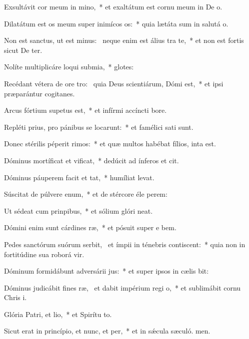 \item Exsultávit cor meum in mino,~* et exaltátum est cornu meum in De o.
\item Dilatátum est os meum super inimícos os:~* quia lætáta sum in salutá o.
\item Non est sanctus, ut est minus:~\pscross{} neque enim est álius tra te,~* et non est fortis sicut De ter.
\item Nolíte multiplicáre loqui submia,~* glotes:
\item Recédant vétera de ore tro:~\pscross{} quia Deus scientiárum, Dómi est,~* et ipsi præparántur cogitanes.
\item Arcus fórtium supetus est,~* et infírmi accíncti  bore.
\item Repléti prius, pro pánibus se locarunt:~* et famélici sati sunt.
\item Donec stérilis péperit rimos:~* et quæ multos habébat fílios, inta est.
\item Dóminus mortíficat et vificat,~* dedúcit ad ínferos et cit.
\item Dóminus páuperem facit et tat,~* humíliat  levat.
\item Súscitat de púlvere enum,~* et de stércore éle perem:
\item Ut sédeat cum prinpibus,~* et sólium glóri neat.
\item Dómini enim sunt cárdines ræ,~* et pósuit super e bem.
\item Pedes sanctórum suórum serbit,~\pscross{} et ímpii in ténebris contiscent:~* quia non in fortitúdine sua roborá vir.
\item Dóminum formidábunt adversárii jus:~* et super ipsos in cælis bit:
\item Dóminus judicábit fines ræ,~\pscross{} et dabit impérium regi o,~* et sublimábit cornu Chris i.
\item Glória Patri, et lio,~* et Spirítu to.
\item Sicut erat in princípio, et nunc, et per,~* et in sǽcula sæculó. men.
